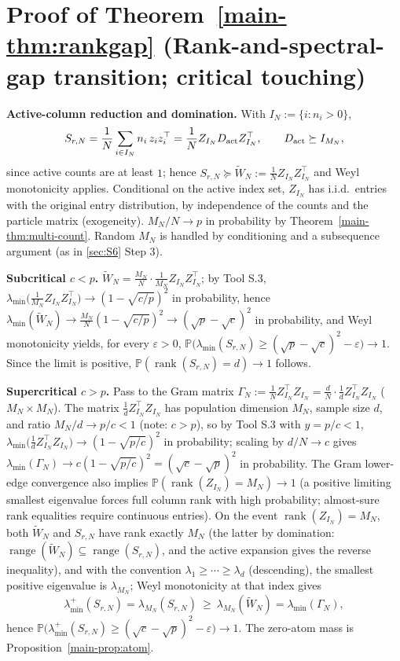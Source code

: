\section{Proof of Theorem~\ref{main-thm:rankgap} (Rank-and-spectral-gap transition; critical touching)}\label{sec:S12}

\textbf{Active-column reduction and domination.} With $I_N:=\{i:n_i>0\}$,
\[
S_{r,N}=\frac1N\sum_{i\in I_N}n_i\,z_iz_i^\top=\frac1N Z_{I_N}D_{\rm act}Z_{I_N}^\top,\qquad D_{\rm act}\succeq I_{M_N},
\]
since active counts are at least $1$; hence $S_{r,N}\succeq\widetilde W_N:=\frac1NZ_{I_N}Z_{I_N}^\top$ and Weyl monotonicity applies. Conditional on the active index set, $Z_{I_N}$ has i.i.d.\ entries with the original entry distribution, by independence of the counts and the particle matrix (exogeneity). $M_N/N\to p$ in probability by Theorem~\ref{main-thm:multi-count}. Random $M_N$ is handled by conditioning and a subsequence argument (as in \ref{sec:S6} Step 3).

\textbf{Subcritical $c<p$.} $\widetilde W_N=\frac{M_N}{N}\cdot\frac1{M_N}Z_{I_N}Z_{I_N}^\top$; by Tool S.3, $\lambda_{\min}\big(\frac1{M_N}Z_{I_N}Z_{I_N}^\top\big)\to(1-\sqrt{c/p})^2$ in probability, hence $\lambda_{\min}(\widetilde W_N)\to\frac{M_N}{N}(1-\sqrt{c/p})^2\to(\sqrt p-\sqrt c)^2$ in probability, and Weyl monotonicity yields, for every $\varepsilon>0$, $\mathbb P\big(\lambda_{\min}(S_{r,N})\ge(\sqrt p-\sqrt c)^2-\varepsilon\big)\to1$. Since the limit is positive, $\mathbb P(\operatorname{rank}(S_{r,N})=d)\to1$ follows.

\textbf{Supercritical $c>p$.} Pass to the Gram matrix $\Gamma_N:=\frac1NZ_{I_N}^\top Z_{I_N}=\frac dN\cdot\frac1dZ_{I_N}^\top Z_{I_N}$ ($M_N\times M_N$). The matrix $\frac1dZ_{I_N}^\top Z_{I_N}$ has population dimension $M_N$, sample size $d$, and ratio $M_N/d\to p/c<1$ (note: $c>p$), so by Tool S.3 with $y=p/c<1$, $\lambda_{\min}\big(\frac1dZ_{I_N}^\top Z_{I_N}\big)\to(1-\sqrt{p/c})^2$ in probability; scaling by $d/N\to c$ gives $\lambda_{\min}(\Gamma_N)\to c(1-\sqrt{p/c})^2=(\sqrt c-\sqrt p)^2$ in probability. The Gram lower-edge convergence also implies $\mathbb P(\operatorname{rank}(Z_{I_N})=M_N)\to1$ (a positive limiting smallest eigenvalue forces full column rank with high probability; almost-sure rank equalities require continuous entries). On the event $\operatorname{rank}(Z_{I_N})=M_N$, both $\widetilde W_N$ and $S_{r,N}$ have rank exactly $M_N$ (the latter by domination: $\operatorname{range}(\widetilde W_N)\subseteq\operatorname{range}(S_{r,N})$, and the active expansion gives the reverse inequality), and with the convention $\lambda_1\ge\cdots\ge\lambda_d$ (descending), the smallest positive eigenvalue is $\lambda_{M_N}$; Weyl monotonicity at that index gives
\[
\lambda_{\min}^{+}(S_{r,N})=\lambda_{M_N}(S_{r,N})\ \ge\ \lambda_{M_N}(\widetilde W_N)=\lambda_{\min}(\Gamma_N),
\]
hence $\mathbb P\big(\lambda_{\min}^+(S_{r,N})\ge(\sqrt c-\sqrt p)^2-\varepsilon\big)\to1$. The zero-atom mass is Proposition~\ref{main-prop:atom}.

